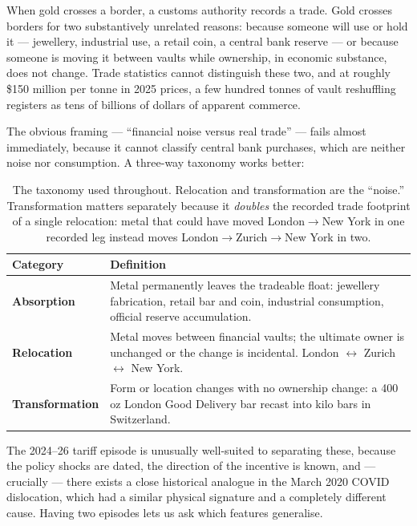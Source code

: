 \documentclass[11pt,a4paper]{article}
\begin{document}
When gold crosses a border, a customs authority records a trade. Gold crosses borders for two
substantively unrelated reasons: because someone will use or hold it --- jewellery, industrial
use, a retail coin, a central bank reserve --- or because someone is moving it between vaults
while ownership, in economic substance, does not change. Trade statistics cannot distinguish
these two, and at roughly \$150 million per tonne in 2025 prices, a few hundred tonnes of vault
reshuffling registers as tens of billions of dollars of apparent commerce.

The obvious framing --- ``financial noise versus real trade'' --- fails almost immediately,
because it cannot classify central bank purchases, which are neither noise nor consumption. A
three-way taxonomy works better:

\begin{table}[h]
\centering
\begin{tabular}{@{}lp{9.5cm}@{}}
\toprule
\textbf{Category} & \textbf{Definition} \\
\midrule
\textbf{Absorption} & Metal permanently leaves the tradeable float: jewellery fabrication,
retail bar and coin, industrial consumption, official reserve accumulation. \\
\addlinespace
\textbf{Relocation} & Metal moves between financial vaults; the ultimate owner is unchanged or
the change is incidental. London $\leftrightarrow$ Zurich $\leftrightarrow$ New York. \\
\addlinespace
\textbf{Transformation} & Form or location changes with no ownership change: a 400\,oz London
Good Delivery bar recast into kilo bars in Switzerland. \\
\bottomrule
\end{tabular}
\caption{The taxonomy used throughout. Relocation and transformation are the ``noise.''
Transformation matters separately because it \emph{doubles} the recorded trade footprint of a
single relocation: metal that could have moved London$\to$New York in one recorded leg instead
moves London$\to$Zurich$\to$New York in two.}
\end{table}

The 2024--26 tariff episode is unusually well-suited to separating these, because the policy
shocks are dated, the direction of the incentive is known, and --- crucially --- there exists a
close historical analogue in the March 2020 COVID dislocation, which had a similar physical
signature and a completely different cause. Having two episodes lets us ask which features
generalise.
\end{document}
